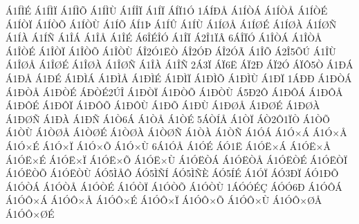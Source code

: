 {^^c11^^cd^^cc^^c9
^^c11^^cd^^cc^^cf
^^c11^^cd^^cc^^d5
^^c11^^cd^^cc^^d9
^^c11^^cd^^ce^^cf
^^c11^^cd^^cf
^^c1^^cd^^cf1^^d3
1^^c1^^cd^^d0^^c5
^^c11^^cd^^d2^^c1
^^c11^^cd^^d2^^c5
^^c11^^cd^^d2^^c9
^^c11^^cd^^d2^^cf
^^c11^^cd^^d2^^d5
^^c11^^cd^^d2^^d9
^^c11^^cd^^d5
^^c1^^cd1^^de
^^c11^^cd^^db
^^c11^^cd^^d9
^^c11^^cd^^d8^^c5
^^c11^^cd^^d8^^c9
^^c11^^cd^^d8^^c0
^^c11^^cd^^d8^^d1
^^c11^^cd^^c0
^^c11^^cd^^d1
^^c11^^ce^^c1
^^c11^^ce^^c5
^^c11^^ce^^c9
^^c16^^ce^^c9^^ce^^d3
^^c11^^ce^^cf
^^c12^^ce1^^cf^^c2
6^^c1^^ce^^cf^^d3
^^c11^^ce^^d2^^c1
^^c11^^ce^^d2^^c5
^^c11^^ce^^d2^^c9
^^c11^^ce^^d2^^cf
^^c11^^ce^^d2^^d5
^^c11^^ce^^d2^^d9
^^c1^^ce2^^d31^^cb^^d2
^^c1^^ce2^^d3^^d0
^^c1^^ce2^^d3^^c3
^^c11^^ce^^d5
^^c12^^ce5^^d5^^da
^^c11^^ce^^d9
^^c11^^ce^^d8^^c5
^^c11^^ce^^d8^^c9
^^c11^^ce^^d8^^c0
^^c11^^ce^^d8^^d1
^^c11^^ce^^c0
^^c11^^ce^^d1
2^^c13^^cf
^^c1^^cf6^^cb
^^c1^^cf2^^d0
^^c1^^cf2^^d3
^^c1^^cf^^d45^^d2
^^c11^^d0^^c1
^^c11^^d0^^c5
^^c11^^d0^^c9
^^c11^^d0^^cc^^c1
^^c11^^d0^^cc^^c5
^^c11^^d0^^cc^^c9
^^c11^^d0^^cc^^cf
^^c11^^d0^^cc^^d5
^^c11^^d0^^cc^^d9
^^c11^^d0^^cf
1^^c1^^d0^^d0
^^c11^^d0^^d2^^c1
^^c11^^d0^^d2^^c5
^^c11^^d0^^d2^^c9
^^c1^^d0^^d2^^c92^^da^^ce
^^c11^^d0^^d2^^cf
^^c11^^d0^^d2^^d5
^^c11^^d0^^d2^^d9
^^c15^^d02^^d4
^^c11^^d0^^d4^^c1
^^c11^^d0^^d4^^c5
^^c11^^d0^^d4^^c9
^^c11^^d0^^d4^^cf
^^c11^^d0^^d4^^d5
^^c11^^d0^^d4^^d9
^^c11^^d0^^d5
^^c11^^d0^^d9
^^c11^^d0^^d8^^c5
^^c11^^d0^^d8^^c9
^^c11^^d0^^d8^^c0
^^c11^^d0^^d8^^d1
^^c11^^d0^^c0
^^c11^^d0^^d1
^^c11^^d26^^c1
^^c11^^d2^^c5
^^c11^^d2^^c9
5^^c1^^d2^^cd^^c5
^^c11^^d2^^cf
^^c1^^d22^^d41^^cf^^d2
^^c11^^d2^^d5
^^c11^^d2^^d9
^^c11^^d2^^d8^^c5
^^c11^^d2^^d8^^c9
^^c11^^d2^^d8^^c0
^^c11^^d2^^d8^^d1
^^c11^^d2^^c0
^^c11^^d2^^d1
^^c11^^d3^^c1
^^c11^^d3^^d7^^c1
^^c11^^d3^^d7^^c5
^^c11^^d3^^d7^^c9
^^c11^^d3^^d7^^cf
^^c11^^d3^^d7^^d5
^^c11^^d3^^d7^^d9
6^^c11^^d3^^c5
^^c11^^d3^^c9
^^c1^^d31^^cb
^^c11^^d3^^cb^^d7^^c1
^^c11^^d3^^cb^^d7^^c5
^^c11^^d3^^cb^^d7^^c9
^^c11^^d3^^cb^^d7^^cf
^^c11^^d3^^cb^^d7^^d5
^^c11^^d3^^cb^^d7^^d9
^^c11^^d3^^cb^^d2^^c1
^^c11^^d3^^cb^^d2^^c5
^^c11^^d3^^cb^^d2^^c9
^^c11^^d3^^cb^^d2^^cf
^^c11^^d3^^cb^^d2^^d5
^^c11^^d3^^cb^^d2^^d9
^^c1^^d35^^cc^^c5^^d4
^^c1^^d35^^cc^^d1^^cd
^^c1^^d35^^cc^^d1^^c8
^^c1^^d35^^cd^^c9
^^c11^^d3^^cf
^^c1^^d33^^d0^^cf
^^c1^^d31^^d0^^d5
^^c11^^d3^^d2^^c1
^^c11^^d3^^d2^^c5
^^c11^^d3^^d2^^c9
^^c11^^d3^^d2^^cf
^^c11^^d3^^d2^^d5
^^c11^^d3^^d2^^d9
1^^c1^^d3^^d3^^c9^^c7
^^c1^^d3^^d36^^d0
^^c11^^d3^^d4^^c1
^^c11^^d3^^d4^^d7^^c1
^^c11^^d3^^d4^^d7^^c5
^^c11^^d3^^d4^^d7^^c9
^^c11^^d3^^d4^^d7^^cf
^^c11^^d3^^d4^^d7^^d5
^^c11^^d3^^d4^^d7^^d9
^^c11^^d3^^d4^^d7^^d8^^c5
^^c11^^d3^^d4^^d7^^d8^^c9
}
